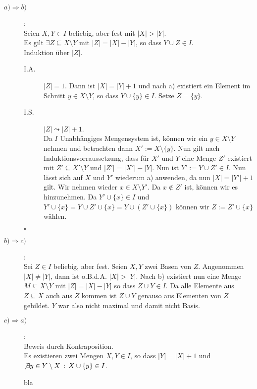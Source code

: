 \documentclass[11pt,a4paper,ngerman]{article}
\begin{document}
\begin{description}
    \item[$a) \Rightarrow b)$]:\\
        Seien $X,Y \in I$ beliebig, aber fest mit $|X| > |Y|$.\\
        Es gilt $\exists Z \subseteq X \setminus Y$ mit $|Z| = |X| - |Y|$, so dass
        $Y \cup Z \in I$.\\
        Induktion über $|Z|$.
        \begin{description}
            \item[I.A.] $|Z| = 1$. Dann ist $|X| = |Y| + 1$ und nach a) existiert ein
                Element im Schnitt $y \in X \setminus Y$, so dass $Y \cup \{y\} \in I$.
                Setze $Z = \{ y \}$.
            \item[I.S.] $|Z| \leadsto |Z|+1$.\\
                Da $I$ Unabhängiges Mengensystem ist, können wir ein $y \in X \setminus Y$ nehmen
                und betrachten dann $X' := X \setminus \{y\}$.
                Nun gilt nach Induktionsvorraussetzung, dass für $X'$ und $Y$ eine Menge $Z'$ existiert
                mit $Z' \subseteq X' \setminus Y$ und $|Z'| = |X'| - |Y|$.
                Nun ist $Y' := Y \cup Z' \in I$. Nun lässt sich auf $X$ und $Y'$ wiederum a) anwenden,
                da nun $|X| = |Y'| + 1$ gilt.
                Wir nehmen wieder $x \in X \setminus Y'$. Da $x \not\in Z'$ ist, können wir es hinzunehmen.
                Da $Y' \cup \{x \} \in I$ und $Y' \cup \{x\} = Y \cup Z' \cup \{x\} = Y \cup (Z' \cup \{x\})$
                können wir $Z := Z' \cup \{x\}$ wählen.
        \end{description}
        \mbox{}\hfill$\square$
    \item[$b) \Rightarrow c)$]:\\
        Sei $Z \in I$ beliebig, aber fest. Seien $X, Y$ zwei Basen von $Z$.
        Angenommen $|X| \not= |Y|$, dann ist o.B.d.A. $|X| > |Y|$. Nach b) existiert nun eine Menge
        $M \subseteq X \setminus Y$ mit $|Z| = |X| - |Y|$ so dass $Z \cup Y \in I$. Da alle Elemente aus $Z \subseteq X$
        auch aus $Z$ kommen ist $Z \cup Y$ genauso aus Elementen von $Z$ gebildet. $Y$ war also nicht maximal und damit nicht Basis.
    \item[$c) \Rightarrow a)$]:\\
        Beweis durch Kontraposition.\\
        Es existieren zwei Mengen $X,Y \in I$, so dass $|Y| = |X| + 1$ und $\not \exists y \in Y \setminus X \, : \, X \cup \{y\} \in I$.
        
        bla
\end{description}

\label{LastPage}
\end{document}
